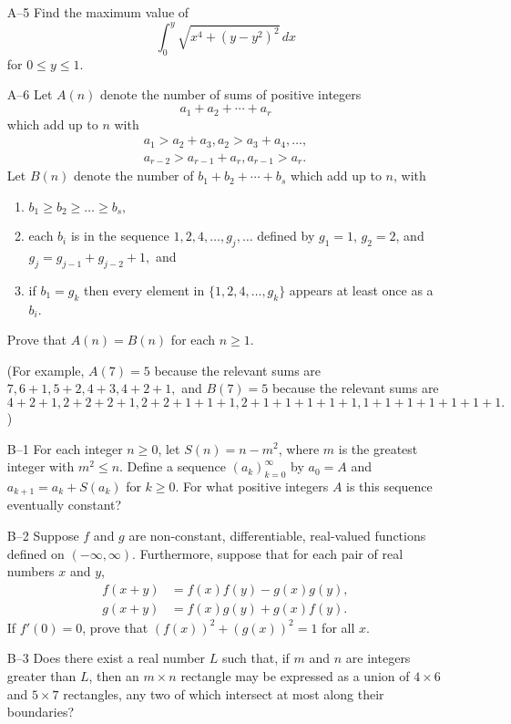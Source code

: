 \documentclass[amssymb,twocolumn,pra,10pt,aps]{revtex4-1}
\begin{document}
\begin{itemize}
\item[A--5]
Find the maximum value of
\[
\int_0^y \sqrt{x^4 + (y-y^2)^2}\,dx
\]
for $0 \leq y \leq 1$.

\item[A--6]
Let $A(n)$ denote the number of sums of positive integers
\[
a_1 + a_2 + \cdots + a_r
\]
which add up to $n$ with
\begin{gather*}
a_1 > a_2 + a_3, a_2 > a_3 + a_4, \ldots, \\
a_{r-2} > a_{r-1} + a_r, a_{r-1}  > a_r.
\end{gather*}
Let $B(n)$ denote the number of $b_1 + b_2 + \cdots + b_s$ which add up
to $n$, with
\begin{enumerate}
    \item $b_1 \geq b_2 \geq \dots \geq b_s,$
    \item each $b_i$ is in the sequence $1, 2, 4, \dots, g_j, \dots$
    defined by $g_1 = 1$, $g_2 = 2$, and $g_j = g_{j-1} + g_{j-2} + 1,$ and
    \item if $b_1 = g_k$ then every element in $\{1, 2, 4, \dots, g_k\}$
    appears at least once as a $b_i$.
\end{enumerate}
Prove that $A(n) = B(n)$ for each $n \geq 1$.

(For example, $A(7) = 5$ because the relevant sums are $7, 6+1, 5+2, 4+3,
4+2+1,$ and $B(7) = 5$ because the relevant sums are $4+2+1, 2+2+2+1,
2+2+1+1+1, 2+1+1+1+1+1, 1+1+1+1+1+1+1.$)

\item[B--1]
For each integer $n \geq 0$, let $S(n) = n - m^2$, where $m$ is the
greatest integer with $m^2 \leq n$. Define a sequence
$(a_k)_{k=0}^\infty$ by $a_0 = A$ and $a_{k+1} = a_k + S(a_k)$ for $k
\geq 0$. For what positive integers $A$ is this sequence eventually constant?

\item[B--2]
Suppose $f$ and $g$ are non-constant, differentiable, real-valued
functions defined on $(-\infty, \infty)$. Furthermore, suppose that for
each pair of real numbers $x$ and $y$,
\begin{align*}
f(x+y) &= f(x)f(y) - g(x)g(y), \\
g(x+y) &= f(x)g(y) + g(x)f(y).
\end{align*}
If $f'(0) = 0$, prove that $(f(x))^2 + (g(x))^2 = 1$ for all $x$.

\item[B--3]
Does there exist a real number $L$ such that, if $m$ and $n$ are integers
greater than $L$, then an $m \times n$ rectangle may be expressed as a
union of $4 \times 6$ and $5 \times 7$ rectangles, any two of which
intersect at most along their boundaries?


\end{itemize}
\end{document}
